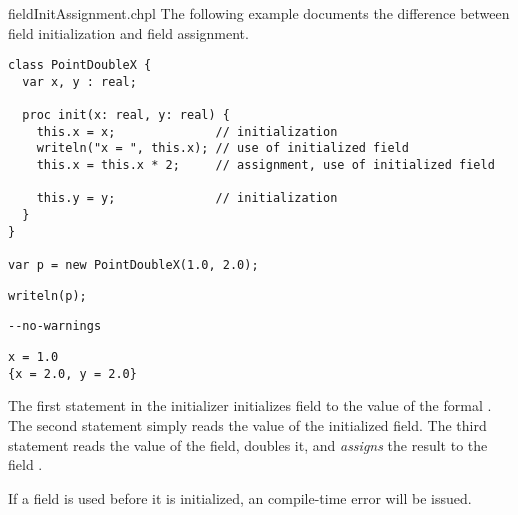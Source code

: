 \begin{chapelexample}{fieldInitAssignment.chpl}
The following example documents the difference between field initialization
and field assignment.
\begin{chapel}
\begin{verbatim}
class PointDoubleX {
  var x, y : real;

  proc init(x: real, y: real) {
    this.x = x;              // initialization
    writeln("x = ", this.x); // use of initialized field
    this.x = this.x * 2;     // assignment, use of initialized field

    this.y = y;              // initialization
  }
}

var p = new PointDoubleX(1.0, 2.0);
\end{verbatim}
\end{chapel}
\begin{chapelpost}
\begin{verbatim}
writeln(p);
\end{verbatim}
\end{chapelpost}
\begin{chapelcompopts}
\begin{verbatim}
--no-warnings
\end{verbatim}
\end{chapelcompopts}
\begin{chapeloutput}
\begin{verbatim}
x = 1.0
{x = 2.0, y = 2.0}
\end{verbatim}
\end{chapeloutput}
The first statement in the initializer initializes field  to the value
of the formal . The second statement simply reads the value of the
initialized field. The third statement reads the value of the field, doubles
it, and {\em assigns} the result to the field .
\end{chapelexample}

If a field is used before it is initialized, an compile-time error will be
issued.

